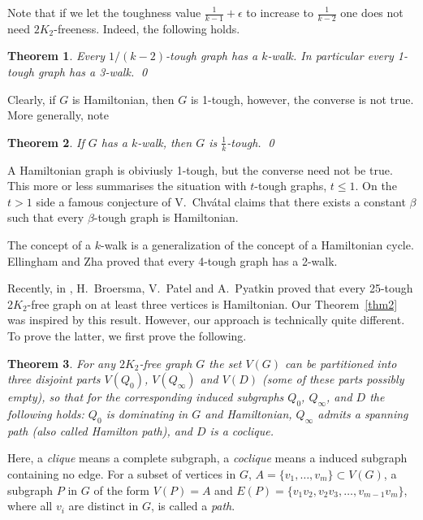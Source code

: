 \documentclass{amsart}
\newtheorem{theorem}{Theorem}
\begin{document}
Note that if we let the toughness value $\frac{1}{k-1}+\epsilon$ to increase to $\frac{1}{k-2}$
one does not need $2K_2$-freeness. Indeed, the following holds.
\begin{theorem}\cite{jackson1990k}\label{cthm1}
Every $1/(k-2)$-tough graph has a $k$-walk. 
In particular every 1-tough graph has a 3-walk. \qed
\end{theorem}
Clearly, if $G$ is
Hamiltonian, then $G$ is 1-tough, however, the converse is not true.  
More generally, note 
\begin{theorem}\cite{jackson1990k}\label{add}
If $G$ has a $k$-walk, then $G$ is $\frac{1}{k}$-tough. \qed
\end{theorem}

A Hamiltonian graph is obiviusly 1-tough, but the converse need not be true.
This more or less summarises the situation with $t$-tough graphs, $t\leq 1$.
On the $t>1$ side 
a famous conjecture of V.~Chv\'{a}tal \cite{chvatal1973tough} claims
that there exists a constant $\beta$ such that every
$\beta$-tough graph is Hamiltonian.  

The concept of a $k$-walk is a generalization of the concept of a Hamiltonian cycle.
Ellingham and Zha \cite{ellingham2000toughness} proved that
every 4-tough graph has a 2-walk.

Recently, in \cite{broersma2014toughness}, H.~Broersma, V.~Patel and A.~Pyatkin proved that 
every 25-tough 2$K_2$-free graph on at least three vertices is Hamiltonian.
Our Theorem~\ref{thm2} was inspired by this result.  However, our
approach is technically quite different.
To prove the latter, we first prove the following.
\begin{theorem}\label{thm1}
For any $2K_2$-free graph $G$ the set $V(G)$ 
can be partitioned into three disjoint parts $V(Q_0)$, $V(Q_{\infty})$ and $V(D)$ (some of these parts possibly empty), so that for the corresponding induced subgraphs
$Q_0$, $Q_\infty$, and $D$ the following holds: $Q_0$ is dominating in $G$ and Hamiltonian, 
$Q_{\infty}$ admits a spanning path (also called Hamilton path), 
and $D$ is a coclique.
\end{theorem}

Here, a {\em clique} means a complete subgraph, a {\em coclique} means a
induced subgraph containing no edge. For a subset of vertices in $G$,
$A=\{v_1,\ldots,v_m\}\subset V(G)$, a subgraph $P$ in $G$ of the form $V(P)=A$
and $E(P)=\{v_1v_2,v_2v_3,\ldots,v_{m-1}v_m\}$, where all $v_i$ are distinct in $G$,
is called a {\em path}.
\end{document}
